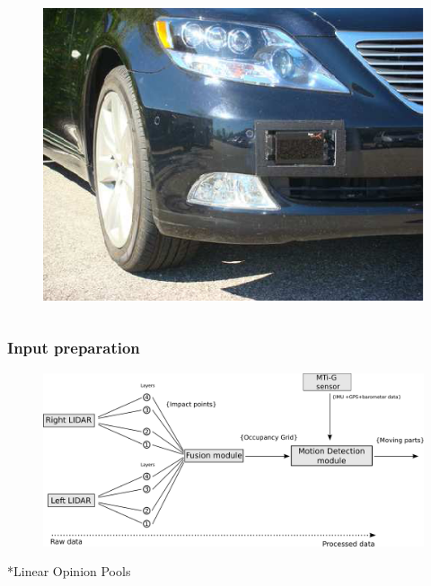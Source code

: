 \documentclass{beamer}
\begin{document}
\begin{frame}
\begin{columns}[t]
		  \begin{column}{5cm}
		  \begin{figure}[h]
			\center
			\includegraphics[scale=0.26]{../img/testbed:ibeo}
		  \end{figure}   
		  \end{column}
		 \end{columns}		 
	\end{frame}	

	\begin{frame}
		\frametitle{Input preparation}
		\begin{figure}[h]
			\center
			\includegraphics[scale=0.18]{../img/fig:motion:framework}
		\end{figure}
		
		*Linear Opinion Pools \cite{ADARVE-2012-671211}
	
	\end{frame}
\end{document}
